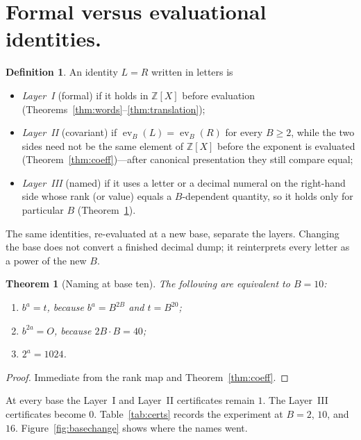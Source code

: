 \documentclass{article}
\DeclareMathOperator{\ev}{ev}
\newcommand{\ZZ}{\mathbb{Z}}
\theoremstyle{plain}
\newtheorem{theorem}{Theorem}
\theoremstyle{definition}
\newtheorem{definition}{Definition}
\theoremstyle{remark}
\begin{document}
\section{Formal versus evaluational identities.}
\label{sec:layers}

\begin{definition}
\label{def:layers}
An identity \(L = R\) written in letters is
\begin{itemize}
\item \emph{Layer~I} (formal) if it holds in \(\ZZ[X]\) before evaluation
(Theorems~\ref{thm:words}--\ref{thm:translation});
\item \emph{Layer~II} (covariant) if \(\ev_B(L)=\ev_B(R)\) for every
\(B \ge 2\), while the two sides need not be the same element of
\(\ZZ[X]\) before the exponent is evaluated (Theorem~\ref{thm:coeff})---after
canonical presentation they still compare equal;
\item \emph{Layer~III} (named) if it uses a letter or a decimal numeral on
the right-hand side whose rank (or value) equals a \(B\)-dependent
quantity, so it holds only for particular \(B\)
(Theorem~\ref{thm:naming}).
\end{itemize}
\end{definition}

The same identities, re-evaluated at a new base, separate the layers.
Changing the base does not convert a finished decimal dump; it reinterprets
every letter as a power of the new \(B\).

\begin{theorem}[Naming at base ten]
\label{thm:naming}
The following are equivalent to \(B=10\):
\begin{enumerate}
\item \(b^a = t\), because \(b^a = B^{2B}\) and \(t = B^{20}\);
\item \(b^{2a} = O\), because \(2B\cdot B = 40\);
\item \(2^a = 1024\).
\end{enumerate}
\end{theorem}

\begin{proof}
Immediate from the rank map and Theorem~\ref{thm:coeff}.
\end{proof}

At every base the Layer~I and Layer~II certificates remain \(1\). The
Layer~III certificates become \(0\). Table~\ref{tab:certs} records the
experiment at \(B=2\), \(10\), and \(16\). Figure~\ref{fig:basechange}
shows where the names went.
\end{document}

